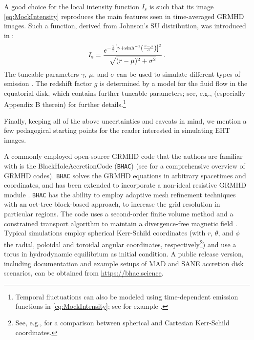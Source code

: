 \documentclass[graybox,envcountchap]{svmult}
\newcommand{\br}[1]{\left[#1\right]}
\newcommand{\pa}[1]{\left(#1\right)}
\begin{document}
A good choice for the local intensity function $I_s$ is such that its image \eqref{eq:MockIntensity} reproduces the main features seen in time-averaged GRMHD images.
Such a function, derived from Johnson's SU distribution, was introduced in \cite{GLM2020,CardenasAvendano2022}:
\begin{align}
    I_{\rm s}=\frac{e^{-\frac{1}{2}\br{\gamma+\sinh^{-1}\pa{\frac{r-\mu}{\sigma}}}^2}}{\sqrt{(r-\mu)^2+\sigma^2}}\,.
\end{align}
The tuneable parameters $\gamma$, $\mu$, and $\sigma$ can be used to simulate different types of emission \cite{Paugnat2022}.
The redshift factor $g$ is determined by a model for the fluid flow in the equatorial disk, which contains further tuneable parameters; see, e.g., \cite{CardenasAvendano2022} (especially Appendix B therein) for further details.\footnote{Temporal fluctuations can also be modeled using time-dependent emission functions in \eqref{eq:MockIntensity}; see for example \cite{Lee2021,CardenasAvendano2022}.}

\bigskip

Finally, keeping all of the above uncertainties and caveats in mind, we mention a few pedagogical starting points for the reader interested in simulating EHT images. 

A commonly employed open-source GRMHD code that the authors are familiar with is the BlackHoleAccretionCode ({\tt BHAC}) \cite{Porth2017,Olivares2019} (see \cite{Porth2019} for a comprehensive overview of GRMHD codes).
{\tt BHAC} solves the GRMHD equations in arbitrary spacetimes and coordinates, and has been extended to incorporate a non-ideal resistive GRMHD module \cite{Ripperda2019}. 
{\tt BHAC} has the ability to employ adaptive mesh refinement techniques with an oct-tree block-based approach, to increase the grid resolution in particular regions.
The code uses a second-order finite volume method and a constrained transport algorithm to maintain a divergence-free magnetic field \cite{Olivares2019}.
Typical simulations employ spherical Kerr-Schild coordinates (with $r$, $\theta$, and $\phi$ the radial, poloidal and toroidal angular coordinates, respectively\footnote{See, e.g., \cite{Davelaar2023} for a comparison between spherical and Cartesian Kerr-Schild coordinates.}) and use a torus in hydrodynamic equilibrium \cite{Fishbone1976} as initial condition.
A public release version, including documentation and example setups of MAD and SANE accretion disk scenarios, can be obtained from \url{https://bhac.science}.
\end{document}
